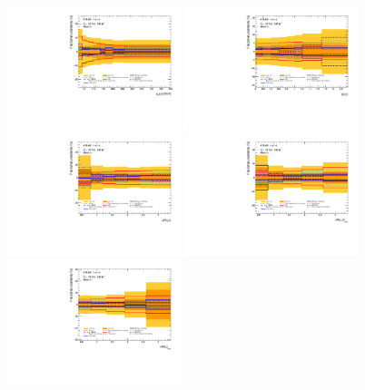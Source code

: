 \begin{figure}[ht]
  \centering
  \includegraphics[width=0.45\textwidth]{figures/diff_xsec/groupedimpact-absolute-xsec/tty_prod_SL/Uncertainty_tty_pt.pdf}%
  \includegraphics[width=0.45\textwidth]{figures/diff_xsec/groupedimpact-absolute-xsec/tty_prod_SL/Uncertainty_tty_eta.pdf}\\%
  \includegraphics[width=0.45\textwidth]{figures/diff_xsec/groupedimpact-absolute-xsec/tty_prod_SL/Uncertainty_tty_drphl.pdf} %
  \includegraphics[width=0.45\textwidth]{figures/diff_xsec/groupedimpact-absolute-xsec/tty_prod_SL/Uncertainty_tty_drphb.pdf}\\%
  \includegraphics[width=0.45\textwidth]{figures/diff_xsec/groupedimpact-absolute-xsec/tty_prod_SL/Uncertainty_tty_drlj.pdf}%

\end{figure}
